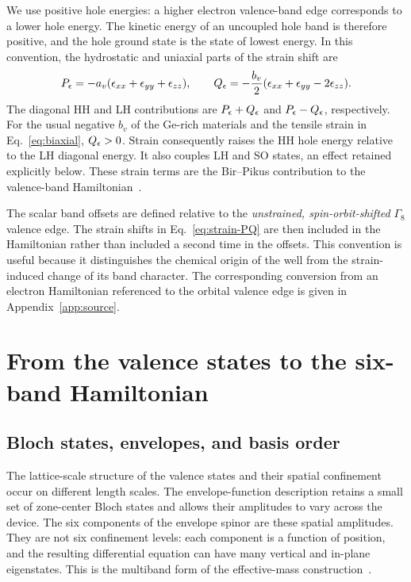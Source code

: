 We use positive hole energies: a higher electron valence-band edge corresponds to a lower hole energy. The kinetic energy of an uncoupled hole band is therefore positive, and the hole ground state is the state of lowest energy. In this convention, the hydrostatic and uniaxial parts of the strain shift are
\begin{equation}
P_\epsilon=-a_v(\epsilon_ {xx}+\epsilon_ {yy}+\epsilon_ {zz}),\qquad
Q_\epsilon=-\frac{b_v}{2}(\epsilon_ {xx}+\epsilon_ {yy}-2\epsilon_ {zz}).
\label{eq:strain-PQ}
\end{equation}
The diagonal HH and LH contributions are $P_\epsilon+Q_\epsilon$ and $P_\epsilon-Q_\epsilon$, respectively. For the usual negative $b_v$ of the Ge-rich materials and the tensile strain in Eq.~\eqref{eq:biaxial}, $Q_\epsilon>0$. Strain consequently raises the HH hole energy relative to the LH diagonal energy. It also couples LH and SO states, an effect retained explicitly below. These strain terms are the Bir--Pikus contribution to the valence-band Hamiltonian~\cite{birpikus,winkler,delvecchio2026}.

The scalar band offsets are defined relative to the \emph{unstrained, spin-orbit-shifted} $\Gamma_8$ valence edge. The strain shifts in Eq.~\eqref{eq:strain-PQ} are then included in the Hamiltonian rather than included a second time in the offsets. This convention is useful because it distinguishes the chemical origin of the well from the strain-induced change of its band character. The corresponding conversion from an electron Hamiltonian referenced to the orbital valence edge is given in Appendix~\ref{app:source}.

\section{From the valence states to the six-band Hamiltonian}
\label{sec:sixband}

\subsection{Bloch states, envelopes, and basis order}

The lattice-scale structure of the valence states and their spatial confinement occur on different length scales. The envelope-function description retains a small set of zone-center Bloch states and allows their amplitudes to vary across the device. The six components of the envelope spinor are these spatial amplitudes. They are not six confinement levels: each component is a function of position, and the resulting differential equation can have many vertical and in-plane eigenstates. This is the multiband form of the effective-mass construction~\cite{luttingerkohn,winkler}.

